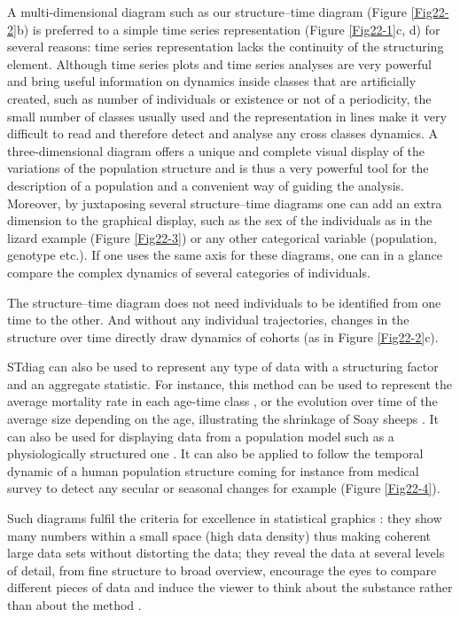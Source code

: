 A multi-dimensional diagram such as our structure--time diagram (Figure \ref{Fig22-2}b) is
preferred to a simple time series representation (Figure \ref{Fig22-1}c, d) for several
reasons: time series representation lacks the continuity of the structuring
element. Although time series plots and time series analyses are very powerful
and bring useful information on dynamics inside classes that are artificially
created, such as number of individuals or existence or not of a periodicity, the
small number of classes usually used and the representation in lines make it
very difficult to read and therefore detect and analyse any cross classes
dynamics. A three-dimensional diagram offers a unique and complete visual
display of the variations of the population structure and is thus a very
powerful tool for the description of a population and a convenient way of
guiding the analysis. Moreover, by juxtaposing several structure--time diagrams
one can add an extra dimension to the graphical display, such as the sex of the
individuals as in the lizard example (Figure \ref{Fig22-3}) or any other categorical variable
(population, genotype etc.). If one uses the same axis for these diagrams, one
can in a glance compare the complex dynamics of several categories of
individuals.

The structure--time diagram does not need individuals to be identified from one
time to the other. And without any individual trajectories, changes in the
structure over time directly draw dynamics of cohorts (as in Figure \ref{Fig22-2}c).

STdiag can also be used to represent any type of data with a structuring factor
and an aggregate statistic. For instance, this method can be used to represent
the average mortality rate in each age-time class \autocite{vaupel1987a}, or the evolution over time of the average size depending on the age,
illustrating the shrinkage of Soay sheeps \autocite{ozgul2009a}. It
can also be used for displaying data from a population model such as a physiologically
structured one \autocite{metz1986a}. It can also be applied to
follow the temporal dynamic of a human population structure coming for instance from
medical survey to detect any secular or seasonal changes for example (Figure \ref{Fig22-4}).

Such diagrams fulfil the criteria for excellence in statistical graphics
\autocite{tufte1990a}: they show many numbers within a small space (high
data density) thus making coherent large data sets without distorting the data; they reveal the
data at several levels of detail, from fine structure to broad overview,
encourage the eyes to compare different pieces of data and induce the viewer to
think about the substance rather than about the method \autocite{tufte2001a}.

